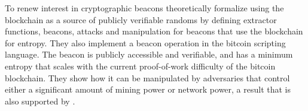 \item[On Bitcoin as a Source of Public Randomness]
To renew interest in cryptographic beacons \citet{bonneau2015bitcoin} theoretically formalize using the blockchain as a source of publicly verifiable randoms by defining extractor functions, beacons, attacks and manipulation for beacons that use the blockchain for entropy.
They also implement a beacon operation in the bitcoin scripting language.
The beacon is publicly accessible and verifiable, and has a minimum entropy that scales with the current proof-of-work difficulty of the bitcoin blockchain.
They show how it can be manipulated by adversaries that control either a significant amount of mining power or network power, a result that is also supported by \citet{pierrot2016malleability}.

